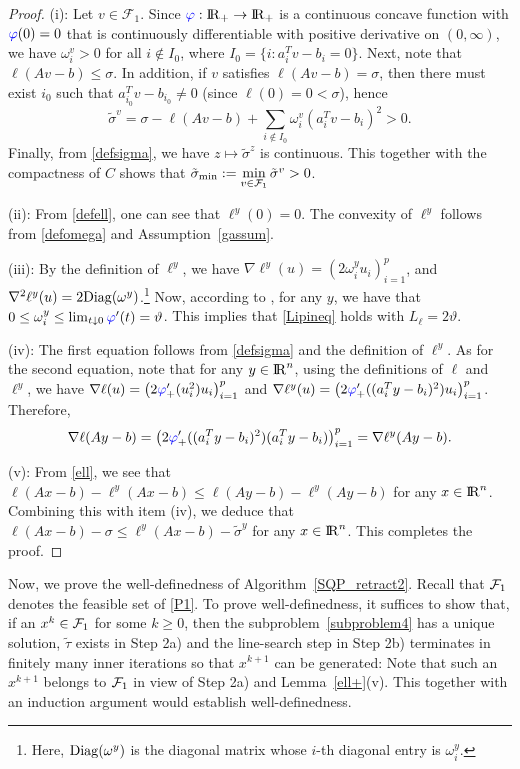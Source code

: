 \documentclass[10pt]{article}
\numberwithin{equation}{section}
\def\R{{\rm I\!R}}
\def\Diag{{\rm Diag}}
\def\sigmamin{{\rm\tilde{\sigma}_{min}}}
\begin{document}
\begin{proof}
(i): Let $v \in \mathcal{F}_1$. Since ${\color{blue} \varphi}:\R_+\to \R_+$ is a continuous concave function with ${\color{blue} \varphi}(0) = 0$ that is continuously differentiable with positive derivative on $(0, \infty)$, we have $\omega_i^v > 0$ for all $i \notin I_0$, where $I_0=\{i: a_i^Tv-b_i=0\}$. Next, note that $\ell(Av - b) \leq \sigma$. In addition, if $v$ satisfies $\ell(Av - b) = \sigma$, then there must exist $i_0$ such that $a_{i_0}^Tv - b_{i_0} \not= 0$ (since $\ell(0) = 0 < \sigma$), hence
\[
\tilde{\sigma}^v = \sigma - \ell(Av - b) + \sum_{ i \notin I_{0}} \omega_i^v(a_i^Tv - b_i)^2 > 0.
 \]
Finally, from \eqref{defsigma}, we have $z\mapsto \tilde{\sigma}^z$ is continuous. This together with the compactness of $C$ shows that $\sigmamin:= \min\limits_{v\in \mathcal{F}_1}\tilde{\sigma}^v > 0$.

(ii): From \eqref{defell}, one can see that $\ell^y(0) = 0$. The convexity of $\ell^y$ follows from \eqref{defomega} and Assumption~\ref{gassum}.

(iii): By the definition of $\ell^y$, we have $\nabla \ell^y (u) = (2\omega_i^yu_i)_{i=1}^p$, and $\nabla^2\ell^y (u) = 2\Diag(\omega^y)$.\footnote{Here, $\Diag(\omega^y)$ is the diagonal matrix whose $i$-th diagonal entry is $\omega^y_i$.} Now, according to \cite[Lemma~2.2]{YuPo19}, for any $y$, we have that $0\le\omega_i^y\leq \lim_{t\downarrow 0}{\color{blue} \varphi}'(t)=\vartheta$. This implies that \eqref{Lipineq} holds with $L_{\ell} = 2\vartheta$.

(iv): The first equation follows from \eqref{defsigma} and the definition of $\ell^y$. As for the second equation, note that for any $y\in\R^n$, using the definitions of $\ell$ and $\ell^y$, we have $\nabla\ell(u) = \left(2{\color{blue} \varphi}_+'(u_i^2)u_i\right)_{i=1}^p$ and $\nabla\ell^y(u) = \left(2{\color{blue} \varphi}_+'((a_i^Ty - b_i)^2)u_i\right)_{i=1}^p$. Therefore,
\[
 \nabla\ell(Ay - b) = \left(2{\color{blue} \varphi}_+'((a_i^Ty - b_i)^2)(a_i^Ty - b_i)\right)_{i=1}^p = \nabla\ell^y(Ay - b).
\]

(v): From \eqref{ell}, we see that $\ell(Ax - b) - \ell^y(Ax - b) \leq \ell(Ay - b) - \ell^y(Ay - b)$ for any $x\in \R^n$. Combining this with item (iv), we deduce that $\ell(Ax - b) - \sigma \leq \ell^y(Ax - b) - \tilde{\sigma}^y$ for any $x\in \R^n$. This completes the proof.
\end{proof}

Now, we prove the well-definedness of Algorithm~\ref{SQP_retract2}. Recall that ${\cal F}_1$ denotes the feasible set of \eqref{P1}. To prove well-definedness, it suffices to show that, if an $x^k\in {\cal F}_1$  for some $k\ge 0$, then the subproblem~\eqref{subproblem4} has a unique solution, $\widetilde\tau$ exists in Step 2a) and the line-search step in Step 2b) terminates in finitely many inner iterations so that $x^{k+1}$ can be generated: Note that such an $x^{k+1}$ belongs to ${\cal F}_1$ in view of Step 2a) and Lemma~\ref{ell+}(v). This together with an induction argument would establish well-definedness.
\end{document}
